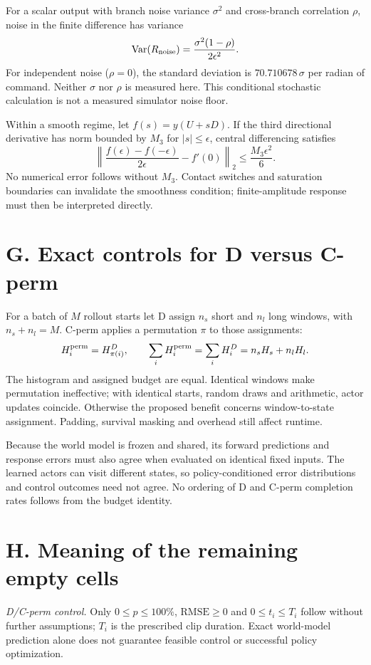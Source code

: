 \documentclass[letterpaper,10pt,conference]{ieeeconf}
\begin{document}
For a scalar output with branch noise variance $\sigma^2$ and cross-branch correlation $\rho$, noise in the finite difference has variance
\begin{equation}
 {\rm Var}(R_{\rm noise})
 =\frac{\sigma^2(1-\rho)}{2\epsilon^2}.
\end{equation}
For independent noise ($\rho=0$), the standard deviation is $70.710678\,\sigma$ per radian of command. Neither $\sigma$ nor $\rho$ is measured here. This conditional stochastic calculation is not a measured simulator noise floor.

Within a smooth regime, let $f(s)=y(U+sD)$. If the third directional derivative has norm bounded by $M_3$ for $|s|\le\epsilon$, central differencing satisfies
\begin{equation}
 \left\|\frac{f(\epsilon)-f(-\epsilon)}{2\epsilon}-f'(0)\right\|_2
 \le\frac{M_3\epsilon^2}{6}.
\end{equation}
No numerical error follows without $M_3$. Contact switches and saturation boundaries can invalidate the smoothness condition; finite-amplitude response must then be interpreted directly.

\section*{G. Exact controls for D versus C-perm}
For a batch of $M$ rollout starts let D assign $n_s$ short and $n_l$ long windows, with $n_s+n_l=M$. C-perm applies a permutation $\pi$ to those assignments:
\begin{equation}
 H_i^{\rm perm}=H_{\pi(i)}^D,\qquad
 \sum_i H_i^{\rm perm}=\sum_i H_i^D=n_sH_s+n_lH_l.
\end{equation}
The histogram and assigned budget are equal. Identical windows make permutation ineffective; with identical starts, random draws and arithmetic, actor updates coincide. Otherwise the proposed benefit concerns window-to-state assignment. Padding, survival masking and overhead still affect runtime.

Because the world model is frozen and shared, its forward predictions and response errors must also agree when evaluated on identical fixed inputs. The learned actors can visit different states, so policy-conditioned error distributions and control outcomes need not agree. No ordering of D and C-perm completion rates follows from the budget identity.

\section*{H. Meaning of the remaining empty cells}
\emph{D/C-perm control.} Only $0\le p\le100\%$, $\mathrm{RMSE}\ge0$ and $0\le t_i\le T_i$ follow without further assumptions; $T_i$ is the prescribed clip duration. Exact world-model prediction alone does not guarantee feasible control or successful policy optimization.
\end{document}

